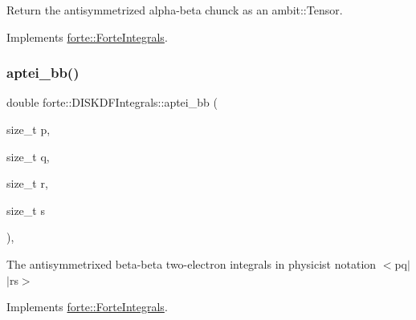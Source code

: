 Return the antisymmetrized alpha-\/beta chunck as an ambit\+::\+Tensor. 



Implements \mbox{\hyperlink{classforte_1_1_forte_integrals_acd40e350dc861baf8adf6a3b47c74023}{forte\+::\+Forte\+Integrals}}.

\mbox{\label{classforte_1_1_d_i_s_k_d_f_integrals_a84224ddc5210cad49b63e74bdd1d4342}} 
\subsubsection{\texorpdfstring{aptei\+\_\+bb()}{aptei\_bb()}}
{\footnotesize\ttfamily double forte\+::\+D\+I\+S\+K\+D\+F\+Integrals\+::aptei\+\_\+bb (\begin{DoxyParamCaption}\item[{size\+\_\+t}]{p,  }\item[{size\+\_\+t}]{q,  }\item[{size\+\_\+t}]{r,  }\item[{size\+\_\+t}]{s }\end{DoxyParamCaption})\hspace{0.3cm}{\ttfamily [override]}, {\ttfamily [virtual]}}



The antisymmetrixed beta-\/beta two-\/electron integrals in physicist notation $<$pq$\vert$$\vert$rs$>$ 



Implements \mbox{\hyperlink{classforte_1_1_forte_integrals_a246225031c3799dc446f94e0e732c3ac}{forte\+::\+Forte\+Integrals}}.

\mbox{\label{classforte_1_1_d_i_s_k_d_f_integrals_a4b78b82f7bb76de677a476d5982e9f89}} 
